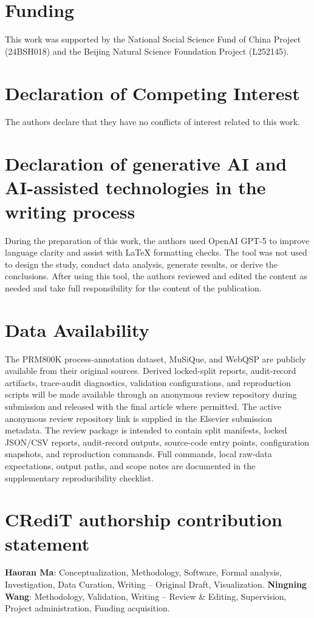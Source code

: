 \documentclass[a4paper,fleqn]{cas-sc}
\begin{document}
\section*{Funding}
This work was supported by the National Social Science Fund of China Project (24BSH018) and the Beijing Natural Science Foundation Project (L252145).

\section*{Declaration of Competing Interest}
The authors declare that they have no conflicts of interest related to this work.

\section*{Declaration of generative AI and AI-assisted technologies in the writing process}
During the preparation of this work, the authors used OpenAI GPT-5 to improve language clarity and assist with LaTeX formatting checks. The tool was not used to design the study, conduct data analysis, generate results, or derive the conclusions. After using this tool, the authors reviewed and edited the content as needed and take full responsibility for the content of the publication.

\section*{Data Availability}
The PRM800K process-annotation dataset, MuSiQue, and WebQSP are publicly available from their original sources. Derived locked-split reports, audit-record artifacts, trace-audit diagnostics, validation configurations, and reproduction scripts will be made available through an anonymous review repository during submission and released with the final article where permitted. The active anonymous review repository link is supplied in the Elsevier submission metadata. The review package is intended to contain split manifests, locked JSON/CSV reports, audit-record outputs, source-code entry points, configuration snapshots, and reproduction commands. Full commands, local raw-data expectations, output paths, and scope notes are documented in the supplementary reproducibility checklist.

\section*{CRediT authorship contribution statement}
\textbf{Haoran Ma}: Conceptualization, Methodology, Software, Formal analysis, Investigation, Data Curation, Writing -- Original Draft, Visualization. \textbf{Ningning Wang}: Methodology, Validation, Writing -- Review \& Editing, Supervision, Project administration, Funding acquisition.
\end{document}
